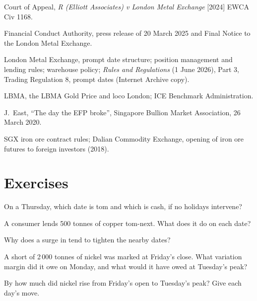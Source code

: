 \begin{omsources}
\item Court of Appeal, \emph{R (Elliott Associates) v London Metal Exchange} [2024] EWCA Civ 1168.
\item Financial Conduct Authority, press release of 20 March 2025 and Final Notice to the London
Metal Exchange.
\item London Metal Exchange, prompt date structure; position management and lending rules; warehouse
policy; \emph{Rules and Regulations} (1 June 2026), Part 3, Trading Regulation 8, prompt dates (Internet Archive copy).
\item LBMA, the LBMA Gold Price and loco London; ICE Benchmark Administration.
\item J.~East, ``The day the EFP broke'', Singapore Bullion Market Association, 26 March 2020.
\item SGX iron ore contract rules; Dalian Commodity Exchange, opening of iron ore futures to foreign
investors (2018).
\end{omsources}

\section{Exercises}

\begin{exercise}[$\star$]\label{exo:m3:metals:1}
On a Thursday, which date is tom and which is cash, if no holidays intervene?
\end{exercise}

\begin{exercise}[$\star$]\label{exo:m3:metals:2}
A consumer lends 500 tonnes of copper tom-next. What does it do on each date?
\end{exercise}

\begin{exercise}[$\star$]\label{exo:m3:metals:3}
Why does a surge in  tend to tighten the nearby dates?
\end{exercise}

\begin{exercise}[$\star\star$]\label{exo:m3:metals:4}
A short of 2\,000 tonnes of nickel was marked at Friday's close. What variation margin did it owe
on Monday, and what would it have owed at Tuesday's peak?
\end{exercise}

\begin{exercise}[$\star\star$]\label{exo:m3:metals:5}
By how much did nickel rise from Friday's open to Tuesday's peak? Give each day's move.
\end{exercise}


